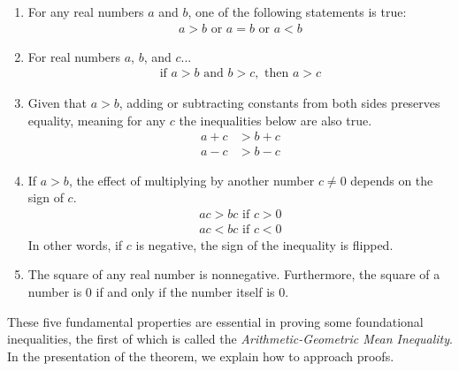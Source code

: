 \documentclass[twoside]{report}
\begin{document}
\begin{enumerate}
	\item For any real numbers $a$ and $b$, one of the following statements is true:
		\begin{align*}
			a > b \text{ or } a = b \text{ or } a < b
		\end{align*}
	\item For real numbers $a$, $b$, and $c$...
		\begin{align*}
			\text{if } a > b \text{ and } b > c, \text{ then } a > c 
		\end{align*}
	\item Given that $a > b$, adding or subtracting constants from both sides preserves equality, meaning for any $c$ the inequalities below are also true.
		\begin{align*}
			a + c &> b + c \\
			a - c &> b - c
		\end{align*}
	\item If $a > b$, the effect of multiplying by another number $c \neq 0$ depends on the sign of $c$.
		\begin{align*}
			ac > bc \text{ if } c > 0 \\
			ac < bc \text{ if } c < 0
		\end{align*}
		In other words, if $c$ is negative, the sign of the inequality is flipped.
	\item The square of any real number is nonnegative. Furthermore, the square of a number is 0 if and only if the number itself is 0.
\end{enumerate}

These five fundamental properties are essential in proving some foundational inequalities, the first of which is called the \emph{Arithmetic-Geometric Mean Inequality}. In the presentation of the theorem, we explain how to approach proofs. \\
\end{document}
